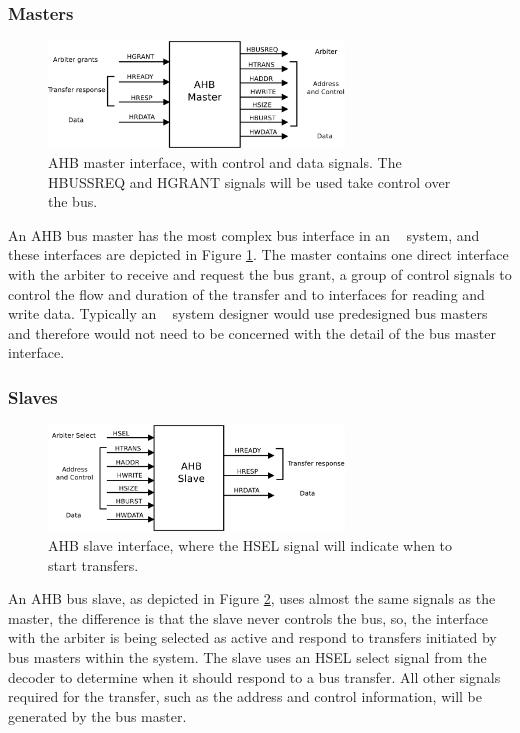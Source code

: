 \subsubsection{Masters}
\begin{figure}[!ht]
    \centering
    \includegraphics[width=0.7\textwidth]{figures/pdf/ahb_master_new.pdf}
    \caption{AHB master interface, with control and data signals. The HBUSSREQ and HGRANT signals  will be used take control over the bus.}
    \label{fig:masterint}
\end{figure}

 An AHB bus master has the most complex bus interface in an \amba~ system, and these interfaces are depicted in Figure \ref{fig:masterint}. The master contains one direct interface with the arbiter to receive and request the bus grant, a group of control signals to control the flow and duration of the transfer and to interfaces for reading and write data.  Typically an \amba~ system designer would use predesigned bus masters and therefore would not need to be concerned with the detail of the bus master interface.



\subsubsection{Slaves}

\begin{figure}[!ht]
    \centering
    \includegraphics[width=0.7\textwidth]{figures/pdf/ahb_slave_new.pdf}
    \caption{AHB slave interface, where the HSEL signal will indicate when to start transfers.}
    \label{fig:slaveint}
\end{figure}
An AHB bus slave, as depicted in Figure \ref{fig:slaveint}, uses almost the same signals as the master, the difference is that the slave never controls the bus, so,  the interface with the arbiter is being selected as active and respond to transfers initiated by bus masters within the system. The slave uses an HSEL select signal from the decoder to determine when it should respond to a bus transfer. All other signals required for the transfer, such as the address and control information, will be generated by the bus master.
 

